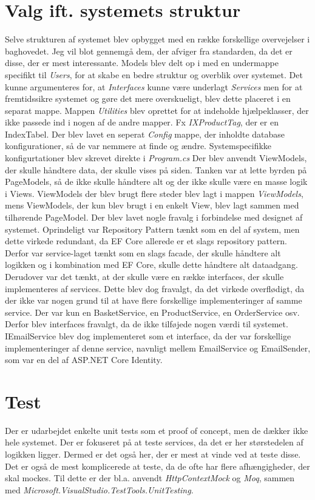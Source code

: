 \section{Valg ift. systemets struktur}
\label{sec:valg-struktur}
Selve strukturen af systemet blev opbygget med en række forskellige overvejelser i baghovedet. Jeg vil blot gennemgå dem, der afviger fra standarden, da det er disse, der er mest interessante.
Models blev delt op i med en undermappe specifikt til \emph{Users}, for at skabe en bedre struktur og overblik over systemet.
Det kunne argumenteres for, at \emph{Interfaces} kunne være underlagt \emph{Services} men for at fremtidssikre systemet og gøre det mere overskueligt, blev dette placeret i en separat mappe.
Mappen \emph{Utilities} blev oprettet for at indeholde hjælpeklasser, der ikke passede ind i nogen af de andre mapper. Fx \emph{IXProductTag}, der er en IndexTabel.
Der blev lavet en seperat \emph{Config} mappe, der inholdte database konfigurationer, så de var nemmere at finde og ændre.
Systemspecifikke konfigurtationer blev skrevet direkte i \emph{Program.cs}
Der blev anvendt ViewModels, der skulle håndtere data, der skulle vises på siden. Tanken var at lette byrden på PageModels, så de ikke skulle håndtere alt og der ikke skulle være en masse logik i Views.
ViewModels der blev brugt flere steder blev lagt i mappen \emph{ViewModels}, mens ViewModels, der kun blev brugt i en enkelt View, blev lagt sammen med tilhørende PageModel.
Der blev lavet nogle fravalg i forbindelse med designet af systemet. Oprindeligt var Repository Pattern tænkt som en del af system, men dette virkede redundant, da EF Core allerede er et slags repository pattern.
Derfor var service-laget tænkt som en slags facade, der skulle håndtere alt logikken og i kombination med EF Core, skulle dette håndtere alt dataadgang.
Derudover var det tænkt, at der skulle være en række interfaces, der skulle implementeres af services. Dette blev dog fravalgt, da det virkede overflødigt, da der ikke var nogen grund til at have flere forskellige implementeringer af samme service.
Der var kun en BasketService, en ProductService, en OrderService osv. Derfor blev interfaces fravalgt, da de ikke tilføjede nogen værdi til systemet.
IEmailService blev dog implementeret som et interface, da der var forskellige implementeringer af denne service, navnligt mellem EmailService og EmailSender, som var en del af ASP.NET Core Identity.

\section{Test}
\label{sec:test}
Der er udarbejdet enkelte unit tests som et proof of concept, men de dækker ikke hele systemet. Der er fokuseret på at teste services, da det er her størstedelen af logikken ligger.
Dermed er det også her, der er mest at vinde ved at teste disse. Det er også de mest komplicerede at teste, da de ofte har flere afhængigheder, der skal mockes. 
Til dette er der bl.a. anvendt \emph{HttpContextMock} og \emph{Moq}, sammen med \emph{Microsoft.VisualStudio.TestTools.UnitTesting}.

